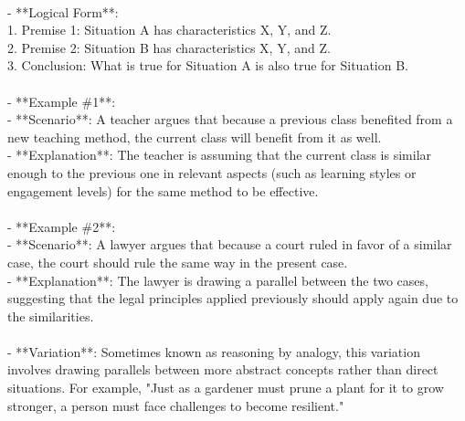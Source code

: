 \documentclass[a4paper,12pt,single,pdftex]{scrartcl}
\begin{document}
    
      
    \\

    
      - **Logical Form**:
    \\

    
        1. Premise 1: Situation A has characteristics X, Y, and Z.
    \\

    
        2. Premise 2: Situation B has characteristics X, Y, and Z.
    \\

    
        3. Conclusion: What is true for Situation A is also true for Situation B.
    \\

    
      
    \\

    
      - **Example \#1**:
    \\

    
        - **Scenario**: A teacher argues that because a previous class benefited from a new teaching method, the current class will benefit from it as well.
    \\

    
        - **Explanation**: The teacher is assuming that the current class is similar enough to the previous one in relevant aspects (such as learning styles or engagement levels) for the same method to be effective.
    \\

    
      
    \\

    
      - **Example \#2**:
    \\

    
        - **Scenario**: A lawyer argues that because a court ruled in favor of a similar case, the court should rule the same way in the present case.
    \\

    
        - **Explanation**: The lawyer is drawing a parallel between the two cases, suggesting that the legal principles applied previously should apply again due to the similarities.
    \\

    
      
    \\

    
      - **Variation**: Sometimes known as reasoning by analogy, this variation involves drawing parallels between more abstract concepts rather than direct situations. For example, "Just as a gardener must prune a plant for it to grow stronger, a person must face challenges to become resilient."
    \\
\end{document}
